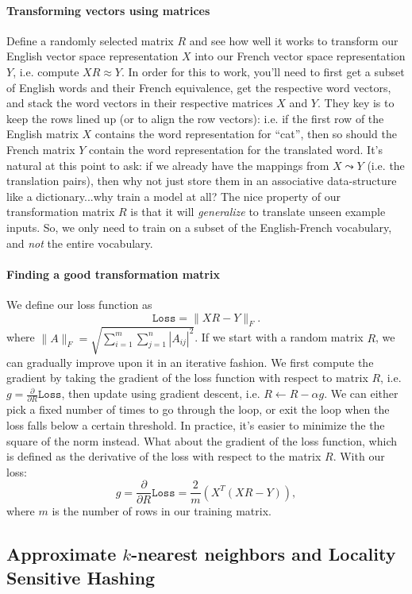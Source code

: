 \documentclass[12pt]{article}
\begin{document}
\paragraph{Transforming vectors using matrices} Define a randomly selected matrix $R$ and see how well it works to transform our English vector space representation $X$ into our French vector space representation $Y$, i.e. compute $XR \approx Y$. In order for this to work, you'll need to first get a subset of English words and their French equivalence, get the respective word vectors, and stack the word vectors in their respective matrices $X$ and $Y$. They key is to keep the rows lined up (or to align the row vectors): i.e. if the first row of the English matrix $X$ contains the word representation for ``cat'', then so should the French matrix $Y$ contain the word representation for the translated word. It's natural at this point to ask: if we already have the mappings from $X \leadsto Y$ (i.e. the translation pairs), then why not just store them in an associative data-structure like a dictionary...why train a model at all? The nice property of our transformation matrix $R$ is that it will \emph{generalize} to translate unseen example inputs. So, we only need to train on a subset of the English-French vocabulary, and \emph{not} the entire vocabulary.

\paragraph{Finding a good transformation matrix} We define our loss function as
\[
  \texttt{Loss} = \|XR - Y\|_F.
\]
where $\|A\|_F = \sqrt{\sum_{i=1}^m \sum_{j=1}^n |A_{ij}|^2}$.
If we start with a random matrix $R$, we can gradually improve upon it in an iterative fashion. We first compute the gradient by taking the gradient of the loss function with respect to matrix $R$, i.e. $g = \frac{\partial}{\partial R}\texttt{Loss}$, then update using gradient descent, i.e. $R \gets R - \alpha g$. We can either pick a fixed number of times to go through the loop, or exit the loop when the loss falls below a certain threshold. In practice, it's easier to minimize the the square of the norm instead. What about the gradient of the loss function, which is defined as the derivative of the loss with respect to the matrix $R$. With our loss:
\[
  g = \frac{\partial}{\partial R} \texttt{Loss} = \frac{2}{m} \left(X^T(XR - Y)\right),
\]
where $m$ is the number of rows in our training matrix.

\subsection{Approximate $k$-nearest neighbors and Locality Sensitive Hashing}
\end{document}
